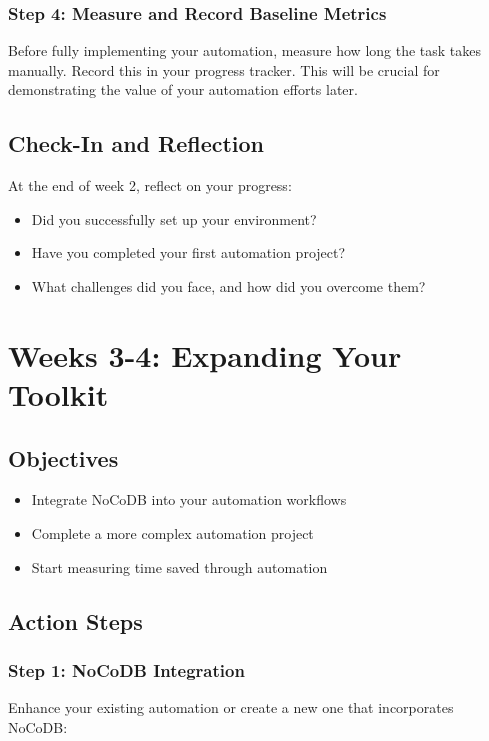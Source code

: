 \subsubsection{Step 4: Measure and Record Baseline Metrics}
Before fully implementing your automation, measure how long the task takes manually. Record this in your progress tracker. This will be crucial for demonstrating the value of your automation efforts later.

\subsection{Check-In and Reflection}
At the end of week 2, reflect on your progress:

\begin{itemize}
    \item Did you successfully set up your environment?
    \item Have you completed your first automation project?
    \item What challenges did you face, and how did you overcome them?
\end{itemize}


\section{Weeks 3-4: Expanding Your Toolkit}

\subsection{Objectives}
\begin{itemize}
    \item Integrate NoCoDB into your automation workflows
    \item Complete a more complex automation project
    \item Start measuring time saved through automation
\end{itemize}

\subsection{Action Steps}

\subsubsection{Step 1: NoCoDB Integration}
Enhance your existing automation or create a new one that incorporates NoCoDB:


